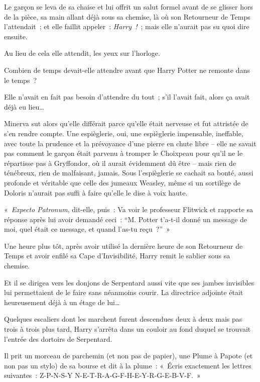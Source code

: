 Le garçon se leva de sa chaise et lui offrit un salut formel avant de se glisser hors de la pièce, sa main allant déjà sous sa chemise, là où son Retourneur de Temps l'attendait~; et elle faillit appeler~: \emph{Harry~!}~; mais elle n'aurait pas su quoi dire ensuite.

Au lieu de cela elle attendit, les yeux sur l'horloge.

Combien de temps devait-elle attendre avant que Harry Potter ne remonte dans le temps~?

Elle n'avait en fait pas besoin d'attendre du tout~; s'il l'avait fait, alors ça avait déjà eu lieu…

Minerva sut alors qu'elle différait parce qu'elle était nerveuse et fut attristée de s'en rendre compte. Une espièglerie, oui, une espièglerie impensable, ineffable, avec toute la prudence et la prévoyance d'une pierre en chute libre -- elle ne savait pas comment le garçon était parvenu à tromper le Choixpeau pour qu'il ne le répartisse pas à Gryffondor, où il aurait évidemment dû être -- mais rien de ténébreux, rien de malfaisant, jamais. Sous l'espièglerie se cachait sa bonté, aussi profonde et véritable que celle des jumeaux Weasley, même si un sortilège de Doloris n'aurait pas suffi à faire qu'elle le dise à voix haute.

«~\emph{Expecto Patronum}, dit-elle, puis~: Va voir le professeur Flitwick et rapporte sa réponse après lui avoir demandé ceci~: “M. Potter t'a-t-il donné un message de moi, quel était ce message, et quand l'as-tu reçu~?”~»

\later

Une heure plus tôt, après avoir utilisé la dernière heure de son Retourneur de Temps et avoir enfilé sa Cape d'Invisibilité, Harry remit le sablier sous sa chemise.

Et il se dirigea vers les donjons de Serpentard aussi vite que ses jambes invisibles lui permettaient de le faire sans néanmoins courir. La directrice adjointe était heureusement déjà à un étage de lui…

Quelques escaliers dont les marchent furent descendues deux à deux mais pas trois à trois plus tard, Harry s'arrêta dans un couloir au fond duquel se trouvait l'entrée des dortoirs de Serpentard.

Il prit un morceau de parchemin (et non pas de papier), une Plume à Papote (et non pas un stylo) de sa bourse et dit à la plume~: «~Écris exactement les lettres suivantes~: Z-P-N-S-Y N-E-T-R-A-G-F-H-E-Y-R-G-E-B-V-F.~»

